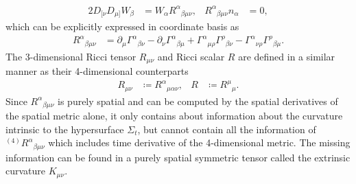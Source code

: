\begin{align}
    2 D_{[\nu} D_{\mu]} W_\beta &= W_\alpha R^\alpha{}_{\beta\mu\nu}, & R^{\alpha}{}_{\beta\mu\nu} n_\alpha &= 0,
\end{align}
which can be explicitly expressed in coordinate basis as
\begin{align}
    R^{\alpha}{}_{\beta\mu\nu} &= \partial_{\mu} \Gamma^{\alpha}{}_{\beta\nu} - \partial_{\nu} \Gamma^{\alpha}{}_{\beta\mu} + \Gamma^{\alpha}{}_{\mu\rho}\Gamma^{\rho}{}_{\beta\nu} - \Gamma^{\alpha}{}_{\nu\rho}\Gamma^{\rho}{}_{\beta\mu}.
\end{align}
The 3-dimensional Ricci tensor $R_{\mu\nu}$ and Ricci scalar $R$ are defined in a similar manner as their 4-dimensional counterparts
\begin{align}
     R_{\mu\nu} &\coloneqq  R^\alpha{}_{\mu\alpha\nu}, & R &\coloneqq  R^{\mu}{}_{\mu}.
\end{align}
Since $R^{\alpha}{}_{\beta\mu\nu}$ is purely spatial and can be computed by the spatial derivatives of the spatial metric alone,
it only contains about information about the curvature intrinsic to the hypersurface $\Sigma_t$,
but cannot contain all the information of ${}^{(4)} R^{\alpha}{}_{\beta\mu\nu}$ which includes time derivative of the 4-dimensional metric.
The missing information can be found in a purely spatial symmetric tensor called the extrinsic curvature $K_{\mu\nu}$.

